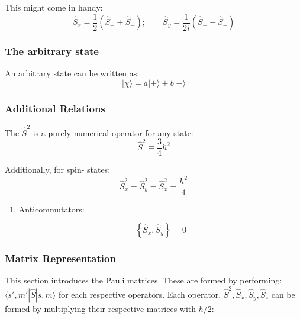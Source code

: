 \documentclass[11pt]{article}
\begin{document}
This might come in handy: \[ \hat{S}_x = \frac12 \left(\hat{S}_+ +
\hat{S}_-\right); \qquad \hat{S}_y =
\frac{1}{2i}\left(\hat{S}_+-\hat{S}_-\right)\]

\subsubsection{The arbitrary state}
\label{sec:orgb596c86}

An arbitrary state can be written as:
\[ |\chi \rangle = a|+\rangle + b|-\rangle \]


\subsubsection{Additional Relations}
\label{sec:org5569682}

The \(\hat{S}^2\) is a purely numerical operator for any state:
\[ \hat{S}^2 \equiv \frac34 \hbar^2\]

Additionally, for spin-\textonehalf{} states:
\[ \hat{S}^2_x = \hat{S}^2_y = \hat{S}^2_x = \frac{\hbar^2}{4} \]

\begin{enumerate}
\item Anticommutators:
\label{sec:orgf979bb2}

\[ \left\{\hat{S}_x, \hat{S}_y\right\} = 0 \]
\end{enumerate}

\subsubsection{Matrix Representation}
\label{sec:org7d65110}

This section introduces the Pauli matrices. These are formed by
performing: \(\langle s',m'| \hat{S} |s,m \rangle\) for each respective
operators. Each operator, \(\hat{S}^2, \hat{S}_x, \hat{S}_y, \hat{S}_z\)
can be formed by multiplying their respective matrices with \(\hbar/2\):
\end{document}
